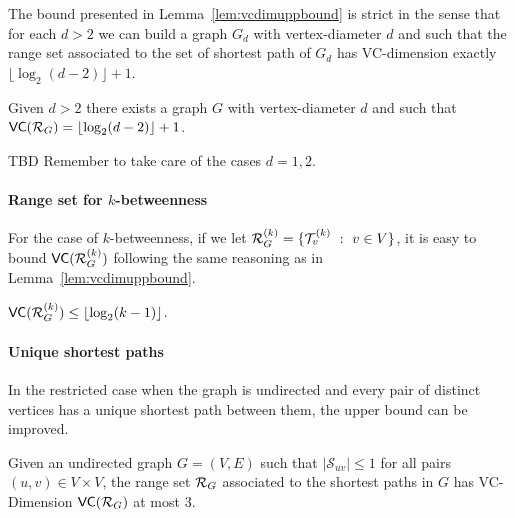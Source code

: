 The bound presented in Lemma~\ref{lem:vcdimuppbound} is strict in the sense that
for each $d>2$ we can build a graph $G_d$ with vertex-diameter $d$ and such
that the range set associated to the set of shortest path of $G_d$ has
VC-dimension exactly $\lfloor\log_2(d-2)\rfloor+1$.

\begin{lemma}\label{lem:vcdimlowbound}
  Given $d>2$ there exists a graph $G$ with vertex-diameter $d$ and such that
  $\mathsf{VC}(\mathcal{R}_G)=\lfloor\log_2(d-2)\rfloor+1$.
\end{lemma}

\begin{IEEEproof}
  \XXX TBD Remember to take care of the cases $d=1,2$.
\end{IEEEproof}

\paragraph{Range set for $k$-betweenness} For the case of $k$-betweenness, if we let
$\mathcal{R}_G^{(k)}=\{\mathcal{T}_v^{(k)}~:~ v\in V\}$, it is easy to bound
$\mathsf{VC}(\mathcal{R}_G^{(k)})$ following the same reasoning as in
Lemma~\ref{lem:vcdimuppbound}.
\begin{lemma}\label{lem:vcdimuppboundk}
$\mathsf{VC}(\mathcal{R}_G^{(k)})\le\lfloor\log_2(k-1)\rfloor$.
\end{lemma}

\paragraph{Unique shortest paths}
In the restricted case when the graph is undirected and every pair of distinct vertices
has a unique shortest path between them, the upper bound can be improved.
\begin{lemma}\label{lem:vcdimuppboundunique}
  Given an undirected graph $G=(V,E)$ such that $|\mathcal{S}_{uv}|\le1$ for all
  pairs $(u,v)\in V\times V$, the range set $\mathcal{R}_G$ associated to the
  shortest paths in $G$ has VC-Dimension $\mathsf{VC}(\mathcal{R}_G)$ at most $3$.
\end{lemma}

